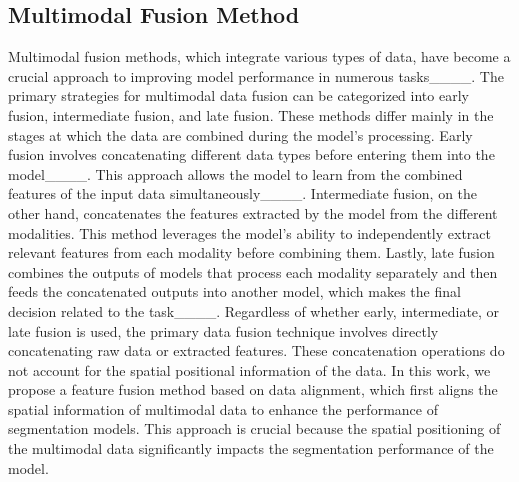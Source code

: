 \subsection{Multimodal Fusion Method}
Multimodal fusion methods, which integrate various types of data, have become a crucial approach to improving model performance in numerous tasks____. The primary strategies for multimodal data fusion can be categorized into early fusion, intermediate fusion, and late fusion. These methods differ mainly in the stages at which the data are combined during the model's processing. Early fusion involves concatenating different data types before entering them into the model____. This approach allows the model to learn from the combined features of the input data simultaneously____. Intermediate fusion, on the other hand, concatenates the features extracted by the model from the different modalities. This method leverages the model's ability to independently extract relevant features from each modality before combining them. Lastly, late fusion combines the outputs of models that process each modality separately and then feeds the concatenated outputs into another model, which makes the final decision related to the task____. Regardless of whether early, intermediate, or late fusion is used, the primary data fusion technique involves directly concatenating raw data or extracted features. These concatenation operations do not account for the spatial positional information of the data. In this work, we propose a feature fusion method based on data alignment, which first aligns the spatial information of multimodal data to enhance the performance of segmentation models. This approach is crucial because the spatial positioning of the multimodal data significantly impacts the segmentation performance of the model. 

